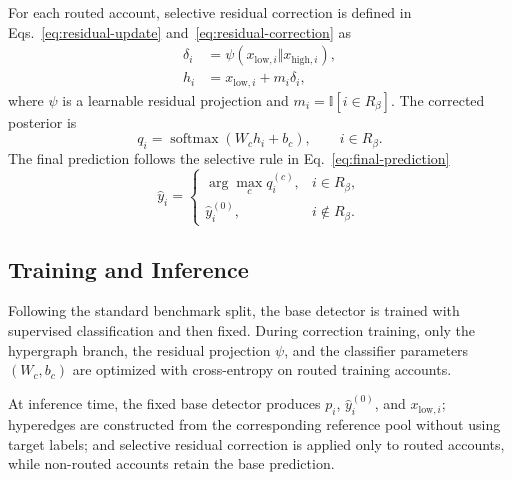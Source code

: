 For each routed account, selective residual correction is defined in Eqs.~\eqref{eq:residual-update} and~\eqref{eq:residual-correction} as
\begin{align}
\delta_i &= \psi(x_{\mathrm{low},i}\Vert x_{\mathrm{high},i}),
\label{eq:residual-update}\\
h_i &= x_{\mathrm{low},i}+m_i\delta_i,
\label{eq:residual-correction}
\end{align}
where $\psi$ is a learnable residual projection and $m_i=\mathbb{I}[i\in R_{\beta}]$. The corrected posterior is
\begin{equation}
q_i=\operatorname{softmax}(W_c h_i+b_c),\qquad i\in R_{\beta}.
\label{eq:corrected-posterior}
\end{equation}
The final prediction follows the selective rule in Eq.~\eqref{eq:final-prediction}
\begin{equation}
\hat{y}_i=
\begin{cases}
\arg\max_c q_i^{(c)}, & i\in R_{\beta},\\
\hat{y}^{(0)}_i, & i\notin R_{\beta}.
\end{cases}
\label{eq:final-prediction}
\end{equation}

\subsection{Training and Inference}

Following the standard benchmark split, the base detector is trained with supervised classification and then fixed. During correction training, only the hypergraph branch, the residual projection $\psi$, and the classifier parameters $(W_c,b_c)$ are optimized with cross-entropy on routed training accounts.

At inference time, the fixed base detector produces $p_i$, $\hat{y}^{(0)}_i$, and $x_{\mathrm{low},i}$; hyperedges are constructed from the corresponding reference pool without using target labels; and selective residual correction is applied only to routed accounts, while non-routed accounts retain the base prediction.
